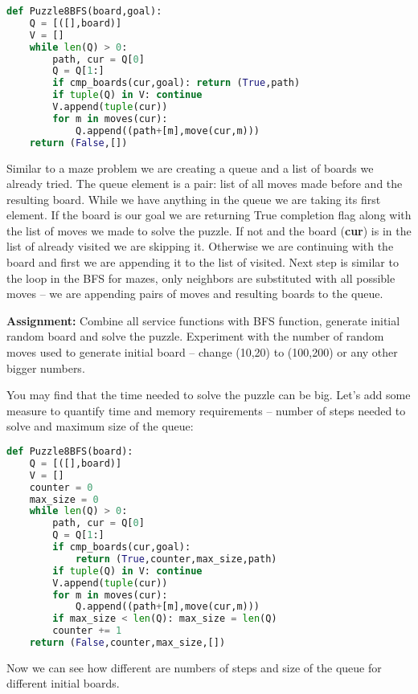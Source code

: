 \begin{lstlisting}[language=Python,style=codelst2,caption={Python: 8-puzzle, BFS}]
def Puzzle8BFS(board,goal):
    Q = [([],board)]
    V = []
    while len(Q) > 0:
        path, cur = Q[0]
        Q = Q[1:]
        if cmp_boards(cur,goal): return (True,path)
        if tuple(Q) in V: continue
        V.append(tuple(cur))
        for m in moves(cur):
            Q.append((path+[m],move(cur,m)))
    return (False,[])
\end{lstlisting}
Similar to a maze problem we are creating a queue and a list of 
boards we already tried. The queue element is a pair: list of all moves
made before and the resulting board. While we have anything in the queue
we are taking its first element. If the board is our goal
we are returning True completion flag along with the 
list of moves we made to
solve the puzzle. If not and the board (\textbf{cur}) is in
the list of already visited we are skipping it. 
Otherwise we are continuing with the board and first we are appending
it to the list of visited. Next step is similar to the loop in
the BFS for mazes, only neighbors are substituted with all possible
moves -- we are appending pairs of moves and resulting boards
to the queue.

\begin{tcolorbox}
\textbf{Assignment:}
Combine all service functions with BFS function,
generate initial random board and solve the puzzle.
Experiment with the number of random moves used to generate 
initial board -- change (10,20) to (100,200) or any other
bigger numbers.
\end{tcolorbox}

You may find that the time needed to solve the puzzle can be
big. Let's add some measure to quantify time and memory
requirements -- number of steps needed to solve and maximum
size of the queue:

\newpage

\begin{lstlisting}[language=Python,style=codelst2,caption={Python: 8-puzzle, BFS with counters}]
def Puzzle8BFS(board):
    Q = [([],board)]
    V = []
    counter = 0
    max_size = 0
    while len(Q) > 0:
        path, cur = Q[0]
        Q = Q[1:]
        if cmp_boards(cur,goal): 
            return (True,counter,max_size,path)
        if tuple(Q) in V: continue
        V.append(tuple(cur))
        for m in moves(cur):
            Q.append((path+[m],move(cur,m)))
        if max_size < len(Q): max_size = len(Q)
        counter += 1
    return (False,counter,max_size,[])
\end{lstlisting}
Now we can see how different are numbers of steps and size of the 
queue for different initial boards.

